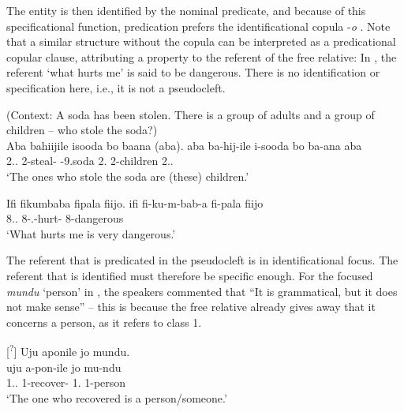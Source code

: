 \documentclass[output=paper]{langscibook}
\begin{document}
The entity is then identified by the nominal predicate, and because of this specificational function, predication prefers the identificational copula -\textit{o} . Note that a similar structure without the copula can be interpreted as a predicational copular clause, attributing a property to the referent of the free relative: In , the referent ‘what hurts me’ is said to be dangerous. There is no identification or specification here, i.e., it is not a pseudocleft.

\ea
\label{bkm:Ref97720875}
(Context: A soda has been stolen. There is a group of adults and a group of children – who stole the soda?)\\
Aba bahiijile isooda bo baana (aba).        \jambox*{[specificational]}
\gll
aba  ba-hij-ile  i-sooda  bo  ba-ana  aba\\
2.\DEM.\PROX{}  2\SM{}-steal-\PFV{}  \AUG{}-9.soda  2.\IDCOP{}  2-children  2.\DEM.\PROX{}\\
\glt
‘The ones who stole the soda are (these) children.’\\

\z


\ea
\label{bkm:Ref97720755}
Ifi fikumbaba fipala fiijo.      \jambox*{[predicational}
\gll
ifi  fi-ku-m-bab-a  fi-pala  fiijo\\
8.\DEM.\PROX{}  8\SM-\SG.\OM{}-hurt-\FV{}  8-dangerous  \INT{}\\
\glt
‘What hurts me is very dangerous.’\\

\z


The referent that is predicated in the pseudocleft is in identificational focus. The referent that is identified must therefore be specific enough. For the focused \textit{mundu} ‘person’ in , the speakers commented that “It is grammatical, but it does not make sense” – this is because the free relative already gives away that it concerns a person, as it refers to class 1.

\ea
[\textsuperscript{?}]{
\label{bkm:Ref98084318}
Uju aponile jo mundu.\\
\gll
uju  a-pon-ile  jo  mu-ndu\\
1.\DEM.\PROX{}  1\SM{}-recover-\PFV{}  1.\IDCOP{}  1-person\\
\glt
‘The one who recovered is a person/someone.’\\
}
\end{document}
